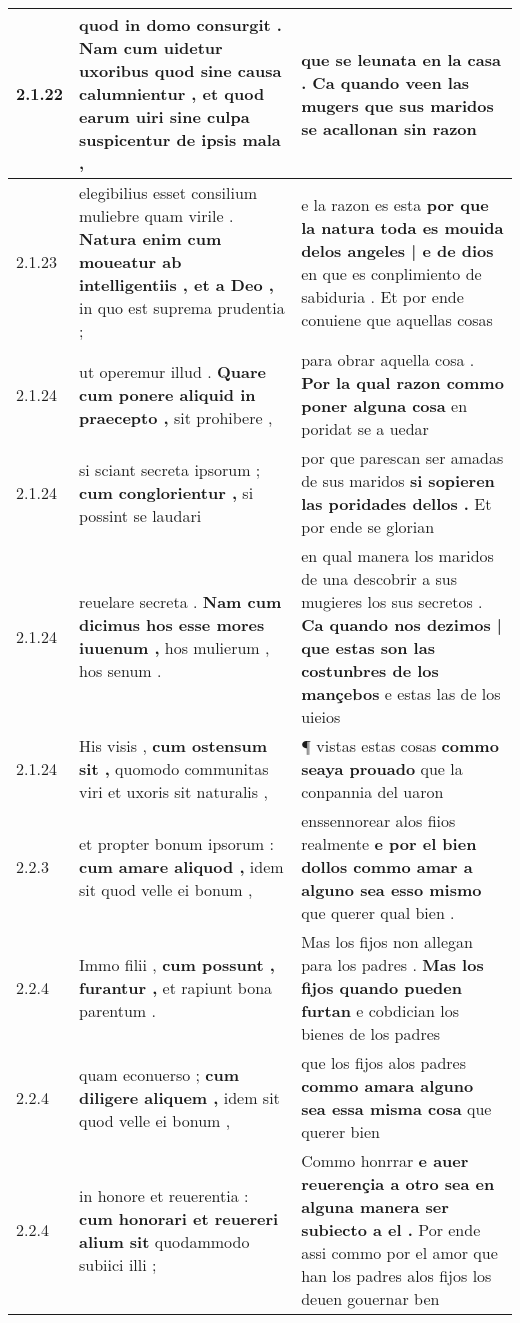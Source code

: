 \begin{tabular}{|p{1cm}|p{6.5cm}|p{6.5cm}|}
2.1.22 & quod in domo consurgit . \textbf{ Nam cum uidetur uxoribus } quod sine causa calumnientur , et quod earum uiri sine culpa suspicentur de ipsis mala , & que se leunata en la casa . \textbf{ Ca quando veen las mugers } que sus maridos se acallonan sin razon \\\hline
2.1.23 & elegibilius esset consilium muliebre quam virile . \textbf{ Natura enim cum moueatur ab intelligentiis , et a Deo , } in quo est suprema prudentia ; & e la razon es esta \textbf{ por que la natura toda es mouida delos angeles | e de dios } en que es conplimiento de sabiduria . Et por ende conuiene que aquellas cosas \\\hline
2.1.24 & ut operemur illud . \textbf{ Quare cum ponere aliquid in praecepto , } sit prohibere , & para obrar aquella cosa . \textbf{ Por la qual razon commo poner alguna cosa } en poridat se a uedar \\\hline
2.1.24 & si sciant secreta ipsorum ; \textbf{ cum conglorientur , } si possint se laudari & por que parescan ser amadas de sus maridos \textbf{ si sopieren las poridades dellos . } Et por ende se glorian \\\hline
2.1.24 & reuelare secreta . \textbf{ Nam cum dicimus hos esse mores iuuenum , } hos mulierum , hos senum . & en qual manera los maridos de una descobrir a sus mugieres los sus secretos . \textbf{ Ca quando nos dezimos | que estas son las costunbres de los mançebos } e estas las de los uieios \\\hline
2.1.24 & His visis , \textbf{ cum ostensum sit , } quomodo communitas viri et uxoris sit naturalis , & ¶ vistas estas cosas \textbf{ commo seaya prouado } que la conpannia del uaron \\\hline
2.2.3 & et propter bonum ipsorum : \textbf{ cum amare aliquod , } idem sit quod velle ei bonum , & enssennorear alos fiios realmente \textbf{ e por el bien dollos commo amar a alguno sea esso mismo } que querer qual bien . \\\hline
2.2.4 & Immo filii , \textbf{ cum possunt , furantur , } et rapiunt bona parentum . & Mas los fijos non allegan para los padres . \textbf{ Mas los fijos quando pueden furtan } e cobdician los bienes de los padres \\\hline
2.2.4 & quam econuerso ; \textbf{ cum diligere aliquem , } idem sit quod velle ei bonum , & que los fijos alos padres \textbf{ commo amara alguno sea essa misma cosa } que querer bien \\\hline
2.2.4 & in honore et reuerentia : \textbf{ cum honorari et reuereri alium sit } quodammodo subiici illi ; & Commo honrrar \textbf{ e auer reuerençia a otro sea en alguna manera ser subiecto a el . } Por ende assi commo por el amor que han los padres alos fijos los deuen gouernar ben \\\hline

\end{tabular}
